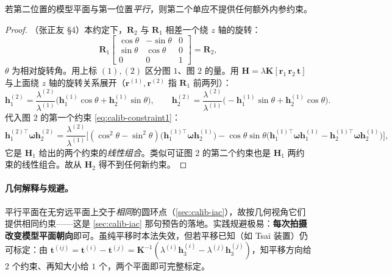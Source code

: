 \begin{theorem}\label{thm:calib-degenerate}
若第二位置的模型平面与第一位置\emph{平行}，则第二个单应不提供任何额外内参约束。
\end{theorem}
\begin{proof}
（张正友 §4\cite{zhang2000calibration}）本约定下，$\mathbf{R}_2$ 与 $\mathbf{R}_1$ 相差一个绕 $z$ 轴的旋转：
\[
  \mathbf{R}_1\begin{bmatrix}\cos\theta&-\sin\theta&0\\ \sin\theta&\cos\theta&0\\ 0&0&1\end{bmatrix}=\mathbf{R}_2,
\]
$\theta$ 为相对旋转角。用上标 $(1),(2)$ 区分图 $1$、图 $2$ 的量。用 $\mathbf{H}=\lambda\mathbf{K}[\mathbf{r}_1\,\mathbf{r}_2\,\mathbf{t}]$ 与上面绕 $z$ 轴的旋转关系展开（$\mathbf{r}^{(1)},\mathbf{r}^{(2)}$ 指 $\mathbf{R}_1$ 前两列）：
\[
  \mathbf{h}_1^{(2)}=\frac{\lambda^{(2)}}{\lambda^{(1)}}\big(\mathbf{h}_1^{(1)}\cos\theta+\mathbf{h}_2^{(1)}\sin\theta\big),\qquad
  \mathbf{h}_2^{(2)}=\frac{\lambda^{(2)}}{\lambda^{(1)}}\big(-\mathbf{h}_1^{(1)}\sin\theta+\mathbf{h}_2^{(1)}\cos\theta\big).
\]
代入图 $2$ 的第一个约束 \cref{eq:calib-constraint1}：
\[
  \mathbf{h}_1^{(2)\top}\boldsymbol{\omega}\mathbf{h}_2^{(2)}
  =\frac{\lambda^{(2)}}{\lambda^{(1)}}\Big[(\cos^2\theta-\sin^2\theta)\big(\mathbf{h}_1^{(1)\top}\boldsymbol{\omega}\mathbf{h}_2^{(1)}\big)
  -\cos\theta\sin\theta\big(\mathbf{h}_1^{(1)\top}\boldsymbol{\omega}\mathbf{h}_1^{(1)}-\mathbf{h}_2^{(1)\top}\boldsymbol{\omega}\mathbf{h}_2^{(1)}\big)\Big],
\]
它是 $\mathbf{H}_1$ 给出的两个约束的\emph{线性组合}。类似可证图 $2$ 的第二个约束也是 $\mathbf{H}_1$ 两约束的线性组合。故从 $\mathbf{H}_2$ 得不到任何新约束。
\end{proof}

\paragraph{几何解释与规避。}
平行平面在无穷远平面上交于\emph{相同}的圆环点（\cref{sec:calib-iac}），故按几何视角它们提供相同约束——这是 \cref{sec:calib-iac} 那句预告的落地。实践规避极易：\textbf{每次拍摄改变模型平面朝向}即可。虽纯平移时本法失效，但若平移已知（如 Tsai 装置\cite{tsai1987versatile}）仍可标定：由 $\mathbf{t}^{(ij)}=\mathbf{t}^{(i)}-\mathbf{t}^{(j)}=\mathbf{K}^{-1}(\lambda^{(i)}\mathbf{h}_3^{(i)}-\lambda^{(j)}\mathbf{h}_3^{(j)})$，知平移方向给 $2$ 个约束、再知大小给 $1$ 个，两个平面即可完整标定\cite{zhang2000calibration}。

